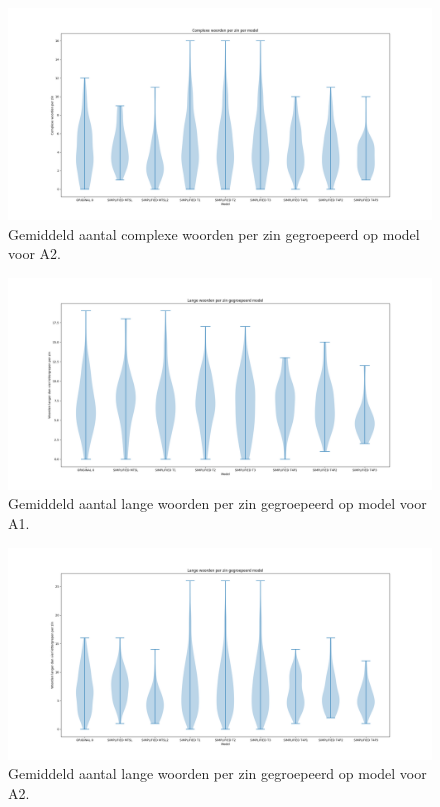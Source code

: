 \begin{figure}
	\includegraphics[width=\linewidth]{img/violinplot-complex-a2.png}
	\caption{Gemiddeld aantal complexe woorden per zin gegroepeerd op model voor A2.}
	\label{img:violinplot-complex-a2}
\end{figure}

\begin{figure}
	\includegraphics[width=\linewidth]{img/violinplot-long-a1.png}
	\caption{Gemiddeld aantal lange woorden per zin gegroepeerd op model voor A1.}
	\label{img:violinplot-long-a1}
\end{figure}

\begin{figure}
	\includegraphics[width=\linewidth]{img/violinplot-long-a2.png}
	\caption{Gemiddeld aantal lange woorden per zin gegroepeerd op model voor A2.}
	\label{img:violinplot-long-a2}
\end{figure}

